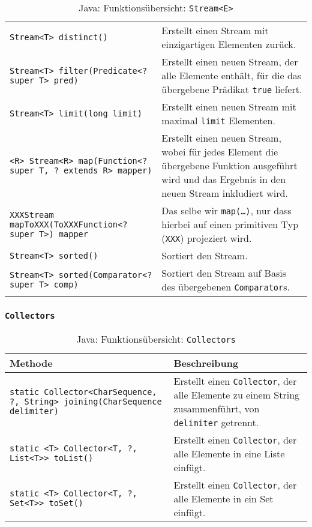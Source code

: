 \begin{sidewaystable}
\begin{tabular}{p{8cm} | p{13cm}}
                    \hline
                    \texttt{Stream<T> distinct()} & Erstellt einen Stream mit einzigartigen Elementen zurück. \\
                    \texttt{Stream<T> filter(Predicate<? super T> pred)} & Erstellt einen neuen Stream, der alle Elemente enthält, für die das übergebene Prädikat \texttt{true} liefert. \\
                    \texttt{Stream<T> limit(long limit)} & Erstellt einen neuen Stream mit maximal \texttt{limit} Elementen. \\
                    \texttt{<R> Stream<R> map(Function<? super T, ? extends R> mapper)} & Erstellt einen neuen Stream, wobei für jedes Element die übergebene Funktion ausgeführt wird und das Ergebnis in den neuen Stream inkludiert wird. \\
                    \texttt{XXXStream mapToXXX(ToXXXFunction<? super T>) mapper} & Das selbe wir \texttt{map(\dots)}, nur dass hierbei auf einen primitiven Typ (\texttt{XXX}) projeziert wird. \\
                    \texttt{Stream<T> sorted()} & Sortiert den Stream. \\
                    \texttt{Stream<T> sorted(Comparator<? super T> comp)} & Sortiert den Stream auf Basis des übergebenen \texttt{Comparator}s. \\
                \end{tabular}
                \caption{Java: Funktionsübersicht: \texttt{Stream<E>}}
            \end{sidewaystable}


        \subsubsection{\texttt{Collectors}}
            \label{java:collectors}
            \begin{sidewaystable}
                \centering
                \begin{tabular}{p{8cm} | p{13cm}}
                    Methode & Beschreibung \\
                    \hline
                    \texttt{static Collector<CharSequence, ?, String> joining(CharSequence delimiter)} & Erstellt einen \texttt{Collector}, der alle Elemente zu einem String zusammenführt, von \texttt{delimiter} getrennt. \\
                    \texttt{static <T> Collector<T, ?, List<T>> toList()} & Erstellt einen \texttt{Collector}, der alle Elemente in eine Liste einfügt. \\
                    \texttt{static <T> Collector<T, ?, Set<T>> toSet()} & Erstellt einen \texttt{Collector}, der alle Elemente in ein Set einfügt. \\
                \end{tabular}
                \caption{Java: Funktionsübersicht: \texttt{Collectors}}
            \end{sidewaystable}


